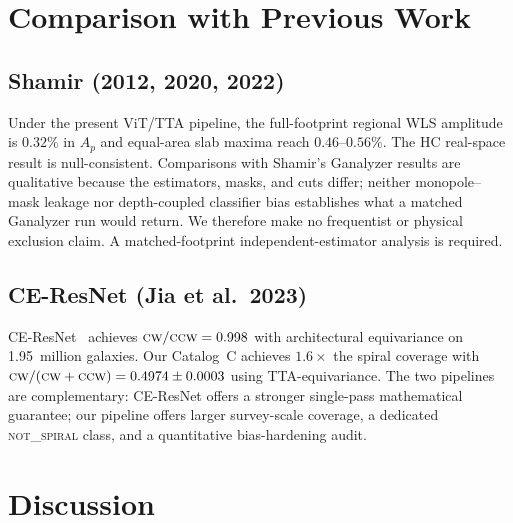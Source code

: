\documentclass[twocolumn,linenumbers]{aastex702}
\newcommand{\CW}{\textsc{cw}}
\newcommand{\CCW}{\textsc{ccw}}
\newcommand{\NS}{\textsc{not\_spiral}}
\begin{document}
\section{Comparison with Previous Work}
\label{sec:comparison}

\subsection{Shamir (2012, 2020, 2022)}

Under the present ViT/TTA pipeline, the full-footprint regional WLS amplitude is $0.32\%$ in $A_p$ and equal-area slab maxima reach $0.46$--$0.56\%$. The HC real-space result is null-consistent. Comparisons with Shamir's Ganalyzer results are qualitative because the estimators, masks, and cuts differ; neither monopole--mask leakage nor depth-coupled classifier bias establishes what a matched Ganalyzer run would return. We therefore make no frequentist or physical exclusion claim. A matched-footprint independent-estimator analysis is required.

\subsection{CE-ResNet (Jia et al.\ 2023)}

CE-ResNet~\cite{Jia:2023} achieves $\CW/\CCW=0.998$ with architectural equivariance on 1.95~million galaxies. Our Catalog~C achieves $1.6\times$ the spiral coverage with $\CW/(\CW+\CCW)=0.4974\pm0.0003$ using TTA-equivariance. The two pipelines are complementary: CE-ResNet offers a stronger single-pass mathematical guarantee; our pipeline offers larger survey-scale coverage, a dedicated \NS{} class, and a quantitative bias-hardening audit.

\section{Discussion}
\label{sec:discussion}
\end{document}
